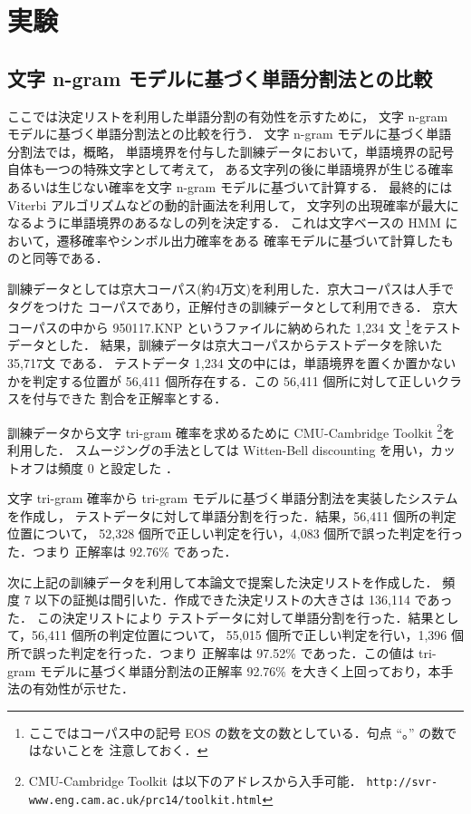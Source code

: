 \section{実験}


\subsection{文字 n-gram モデルに基づく単語分割法との比較}

ここでは決定リストを利用した単語分割の有効性を示すために，
文字 n-gram モデルに基づく単語分割法\cite{oda98}との比較を行う．
文字 n-gram モデルに基づく単語分割法では，概略，
単語境界を付与した訓練データにおいて，単語境界の記号自体も一つの特殊文字として考えて，
ある文字列の後に単語境界が生じる確率あるいは生じない確率を文字 n-gram モデルに基づいて計算する．
最終的には Viterbi アルゴリズムなどの動的計画法を利用して，
文字列の出現確率が最大になるように単語境界のあるなしの列を決定する．
これは文字ベースの HMM において，遷移確率やシンボル出力確率をある
確率モデルに基づいて計算したものと同等である．

訓練データとしては京大コーパス(約4万文)を利用した．京大コーパスは人手でタグをつけた
コーパスであり，正解付きの訓練データとして利用できる．
京大コーパスの中から 950117.KNP というファイルに納められた 1,234 文
\footnote{ここではコーパス中の記号 EOS の数を文の数としている．句点 ``。'' の数ではないことを
注意しておく．}をテストデータとした．
結果，訓練データは京大コーパスからテストデータを除いた 35,717文 である．
テストデータ 1,234 文の中には，単語境界を置くか置かないかを判定する位置が
56,411 個所存在する．この 56,411 個所に対して正しいクラスを付与できた
割合を正解率とする．

訓練データから文字 tri-gram 確率を求めるために CMU-Cambridge Toolkit 
\footnote{CMU-Cambridge Toolkit は以下のアドレスから入手可能．
\mbox{{\tt http://svr-www.eng.cam.ac.uk/\(\tilde{ }\)prc14/toolkit.html}}}を利用した．
スムージングの手法としては Witten-Bell discounting を用い，カットオフは頻度 0 と設定した
\cite{kita99}．

文字 tri-gram 確率から tri-gram モデルに基づく単語分割法を実装したシステムを作成し，
テストデータに対して単語分割を行った．結果，56,411 個所の判定位置について，
52,328 個所で正しい判定を行い，4,083 個所で誤った判定を行った．つまり
正解率は 92.76\% であった．

次に上記の訓練データを利用して本論文で提案した決定リストを作成した．
頻度 7 以下の証拠は間引いた．作成できた決定リストの大きさは 136,114 であった．
この決定リストにより
テストデータに対して単語分割を行った．結果として，56,411 個所の判定位置について，
55,015 個所で正しい判定を行い，1,396 個所で誤った判定を行った．つまり
正解率は 97.52\% であった．この値は tri-gram モデルに基づく単語分割法の正解率
92.76\% を大きく上回っており，本手法の有効性が示せた．

